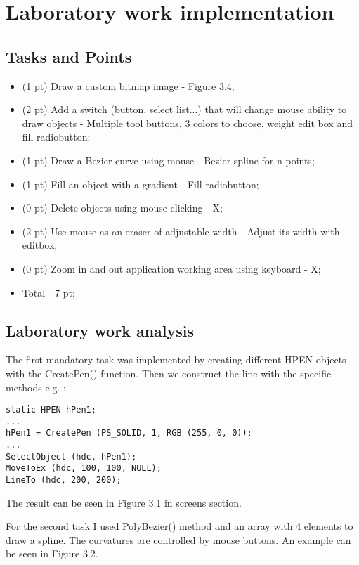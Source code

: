 \section{Laboratory work implementation}

\subsection{Tasks and Points}

\begin{itemize}
	\item (1 pt) Draw a custom bitmap image - Figure 3.4;
	\item (2 pt) Add a switch (button, select list...) that will change mouse ability to draw objects - Multiple tool buttons, 3 colors to choose, weight edit box and fill radiobutton;
	\item (1 pt) Draw a Bezier curve using mouse - Bezier spline for n points; 
	\item (1 pt) Fill an object with a gradient - Fill radiobutton; 
	\item (0 pt) Delete objects using mouse clicking - X; 
	\item (2 pt) Use mouse as an eraser of adjustable width - Adjust its width with editbox;
	\item (0 pt) Zoom in and out application working area using keyboard - X;
	\item Total - 7 pt;
\end{itemize} 

\subsection{Laboratory work analysis}

The first mandatory task was implemented by creating different HPEN objects with the CreatePen() function. Then we construct the line with the specific methods e.g. : 

\begin{lstlisting}
static HPEN hPen1;
...
hPen1 = CreatePen (PS_SOLID, 1, RGB (255, 0, 0));
...
SelectObject (hdc, hPen1);
MoveToEx (hdc, 100, 100, NULL);
LineTo (hdc, 200, 200);
\end{lstlisting}

The result can be seen in Figure 3.1 in screens section. 

For the second task I used PolyBezier() method and an array with 4 elements to draw a spline. The curvatures are controlled by mouse buttons. An example can be seen in Figure 3.2. 

